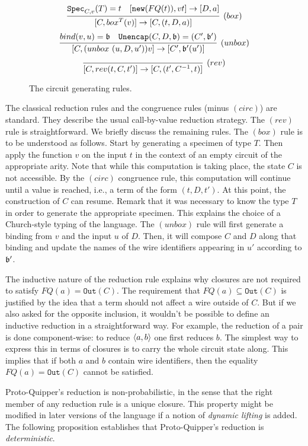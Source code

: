 \documentclass{article}
\begin{document}
\begin{figure}[!ht]
\begin{mdframed}
\[
  \infer[(box)]{[C,box^T(v)]\to [C,(t,D,a)]}{
    \spec_{C,v}(T)=t
    &
    [\mathtt{new}(FQ(t)), vt] \to [D,a]
  }
\]
\[
  \infer[(unbox)]{[C,(unbox~(u,D,u'))v]\to [C',\binding'(u')]}{
    bind(v,u)=\binding 
    &
    \mathtt{Unencap}(C,D,\binding) = (C',\binding') 
  }
\]
\[
  \infer[(rev)]{[C,rev (t,C,t')]\to [C,(t',C^{-1},t)]}{}
\]
\end{mdframed}
\caption{The circuit generating rules.}
\label{circ_gen_rules}
\end{figure}

The classical reduction rules and the congruence rules (minus $(circ)$) are standard. They 
describe the usual call-by-value reduction strategy. The $(rev)$ rule is 
straightforward. We briefly discuss the remaining rules. The $(box)$ rule is 
to be understood as follows. Start by generating a specimen of type $T$. Then 
apply the function $v$ on the input $t$ in the context of an empty circuit of 
the appropriate arity. Note that while this computation is taking place, the 
state $C$ is not accessible. By the $(circ)$ congruence rule, this computation will 
continue until a value is reached, i.e., a term of the form $(t,D,t')$. At this point, 
the construction of $C$ can resume. Remark that it was necessary to know the type 
$T$ in order to generate the appropriate specimen. This explains the choice of a 
Church-style typing of the language. The $(unbox)$ rule will first generate a binding 
from $v$ and the input $u$ of $D$. Then, it will compose $C$ and $D$ along that 
binding and update the names of the wire identifiers appearing in $u'$ 
according to $\mathfrak{b}'$.

The inductive nature of the reduction rule explains why closures are not
required to satisfy $FQ(a)=\mathtt{Out}(C)$. The requirement that 
$FQ(a)\subseteq \mathtt{Out}(C)$ is justified by the idea that a term should 
not affect a wire outside of $C$. But if we also asked for the opposite 
inclusion, it wouldn't be possible to define an inductive reduction in a 
straightforward way. For example, the reduction of a pair is done 
component-wise: to reduce $\langle a,b\rangle$ one first reduces $b$. The simplest way 
to express this in terms of closures is to carry the whole circuit state along. 
This implies that if both $a$ and $b$ contain wire identifiers, then the 
equality $FQ(a)=\mathtt{Out}(C)$ cannot be satisfied.

Proto-Quipper's reduction is non-probabilistic, in the sense that the right member of 
any reduction rule is a unique closure. This property might be modified 
in later versions of the language if a notion of \emph{dynamic lifting} is added. The 
following proposition establishes that Proto-Quipper's reduction is  
\emph{deterministic}.
\end{document}
